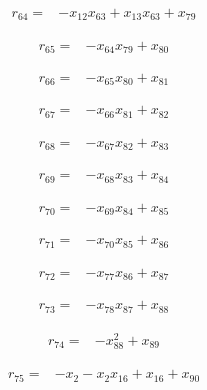 \documentclass[10pt,letterpaper]{article}
\theoremstyle{remark}\newtheorem{remark}[theorem]{Remark}
\begin{document}
\begin{align*}
r_{64}={}&-x_{12}x_{63}+x_{13}x_{63}+x_{79}
\end{align*}

\begin{align*}
r_{65}={}&-x_{64}x_{79}+x_{80}
\end{align*}

\begin{align*}
r_{66}={}&-x_{65}x_{80}+x_{81}
\end{align*}

\begin{align*}
r_{67}={}&-x_{66}x_{81}+x_{82}
\end{align*}

\begin{align*}
r_{68}={}&-x_{67}x_{82}+x_{83}
\end{align*}

\begin{align*}
r_{69}={}&-x_{68}x_{83}+x_{84}
\end{align*}

\begin{align*}
r_{70}={}&-x_{69}x_{84}+x_{85}
\end{align*}

\begin{align*}
r_{71}={}&-x_{70}x_{85}+x_{86}
\end{align*}

\begin{align*}
r_{72}={}&-x_{77}x_{86}+x_{87}
\end{align*}

\begin{align*}
r_{73}={}&-x_{78}x_{87}+x_{88}
\end{align*}

\begin{align*}
r_{74}={}&-x_{88}^{2}+x_{89}
\end{align*}

\begin{align*}
r_{75}={}&-x_{2}-x_{2}x_{16}+x_{16}+x_{90}
\end{align*}
\end{document}

